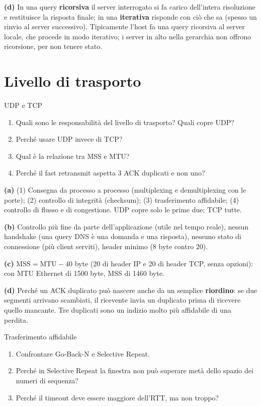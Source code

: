 \textbf{(d)} In una query \textbf{ricorsiva} il server interrogato si fa carico dell'intera risoluzione e restituisce la risposta finale; in
una \textbf{iterativa} risponde con ciò che sa (spesso un rinvio al server successivo). Tipicamente l'host fa una query ricorsiva al server
locale, che procede in modo iterativo; i server in alto nella gerarchia non offrono ricorsione, per non tenere stato.

\section{Livello di trasporto}

\begin{esercizio}{UDP e TCP}
\begin{enumerate}[label=(\alph*)]
    \item Quali sono le responsabilità del livello di trasporto? Quali copre UDP?
    \item Perché usare UDP invece di TCP?
    \item Qual è la relazione tra MSS e MTU?
    \item Perché il fast retransmit aspetta 3 ACK duplicati e non uno?
\end{enumerate}
\end{esercizio}

\svolgimento
\textbf{(a)} (1) Consegna da processo a processo (multiplexing e demultiplexing con le porte); (2) controllo di integrità (checksum);
(3) trasferimento affidabile; (4) controllo di flusso e di congestione. UDP copre solo le prime due; TCP tutte.

\textbf{(b)} Controllo più fine da parte dell'applicazione (utile nel tempo reale), nessun handshake (una query DNS è una domanda e una
risposta), nessuno stato di connessione (più client serviti), header minimo (8 byte contro 20).

\textbf{(c)} $\text{MSS} = \text{MTU} - 40$ byte (20 di header IP e 20 di header TCP, senza opzioni): con MTU Ethernet di 1500 byte,
MSS di 1460 byte.

\textbf{(d)} Perché un ACK duplicato può nascere anche da un semplice \textbf{riordino}: se due segmenti arrivano scambiati, il ricevente
invia un duplicato prima di ricevere quello mancante. Tre duplicati sono un indizio molto più affidabile di una perdita.

\begin{esercizio}{Trasferimento affidabile}
\begin{enumerate}[label=(\alph*)]
    \item Confrontare Go-Back-N e Selective Repeat.
    \item Perché in Selective Repeat la finestra non può superare metà dello spazio dei numeri di sequenza?
    \item Perché il timeout deve essere maggiore dell'RTT, ma non troppo?
\end{enumerate}
\end{esercizio}

